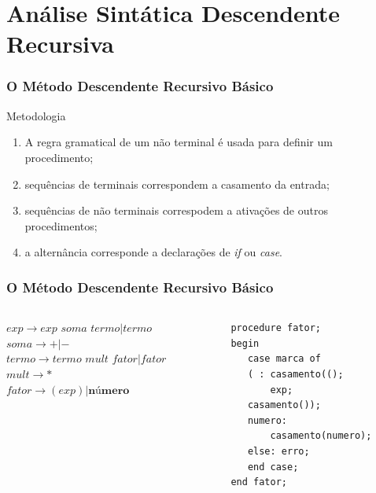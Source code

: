 \documentclass[table]{beamer}
\begin{document}
\section{Análise Sintática Descendente Recursiva}
\begin{frame}
   \frametitle{O Método Descendente Recursivo Básico}
   \begin{block}{Metodologia}
      \begin{enumerate}
         \item A regra gramatical de um não terminal é usada para definir um procedimento;
	 \item sequências de terminais correspondem a casamento da entrada;
	 \item sequências de não terminais correspodem a ativações de outros procedimentos;
	 \item a alternância corresponde a declarações de \textit{if} ou \textit{case}.
      \end{enumerate}
   \end{block}
\end{frame}

\begin{frame}[fragile]
   \frametitle{O Método Descendente Recursivo Básico}
   \begin{columns}
   \begin{column}{0.5\textwidth}
   $\textit{exp} \to \textit{exp soma termo} | \textit{termo}$ \\
   $\textit{soma} \to +|-$ \\
   $\textit{termo} \to \textit{termo mult fator} | \textit{fator}$ \\
   $\textit{mult} \to *$ \\
   $\textit{fator} \to (\textit{exp}) | \textbf{número}$
   \end{column}
   \begin{column}{0.5\textwidth}
   \begin{verbatim}
   procedure fator;
   begin
      case marca of
      ( : casamento(();
          exp;
	  casamento());
      numero:
          casamento(numero);
      else: erro;
      end case;
   end fator;
   \end{verbatim}
   \end{column}
   \end{columns}
\end{frame}
\end{document}
